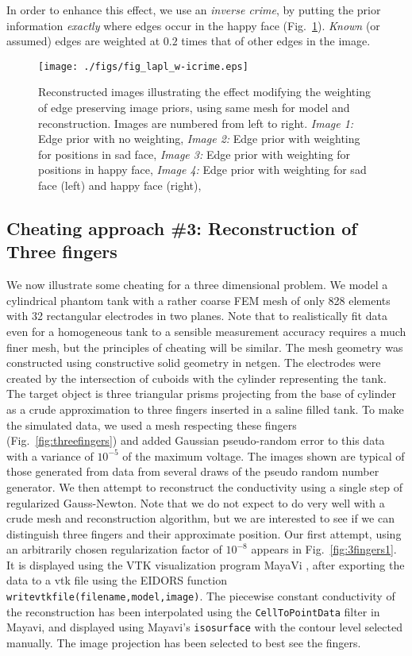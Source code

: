 \documentclass[12pt]{iopart}
\begin{document}
In order to enhance this effect, we use an {\em inverse crime},
by putting the prior information {\em exactly} where edges
occur in the happy face
(Fig.~\ref{fig:laplprior-icrime}).
{\em Known} (or assumed) edges are weighted at $0.2$ times that of other
edges in the image.

%
%
\begin{figure}[th]
\begin{flushright}
\texttt{[image: ./figs/fig\_lapl\_w-icrime.eps]}
\caption{\small 
Reconstructed images illustrating the effect modifying the
weighting of edge preserving image priors,
using same mesh for model and reconstruction.
Images are numbered from left to right.
{\em Image 1:} Edge prior with no weighting,
{\em Image 2:} Edge prior with weighting for positions in sad face,
{\em Image 3:} Edge prior with weighting for positions in happy face,
{\em Image 4:} Edge prior with weighting for sad face (left) and
happy face (right),
 }
 \label{fig:laplprior-icrime}
\end{flushright}
\end{figure}


\subsection{
Cheating approach \#3:
     Reconstruction of Three fingers
}
We now illustrate some cheating for a three dimensional
problem. We model a cylindrical phantom tank with a rather
coarse FEM mesh of only 828 elements with 32 rectangular
electrodes in two planes. Note that to realistically
fit data even for a homogeneous tank to a sensible
measurement accuracy requires a much finer mesh, but the
principles of cheating will be similar. The mesh geometry
was constructed using constructive solid geometry in
netgen. The electrodes were created by the intersection
of cuboids with the cylinder representing the tank. The
target object is three triangular prisms projecting from
the base of cylinder as a crude approximation to three
fingers inserted in a saline filled tank. To make the
simulated data, we used a mesh respecting these fingers
(Fig.~\ref{fig:threefingers}) and added Gaussian pseudo-random
error to this data with a variance of $10^{-5}$ of the maximum
voltage. The images shown are typical of those generated
from data from several draws of the pseudo random number
generator. We then attempt to reconstruct the conductivity
using a single step of regularized Gauss-Newton. Note that we do not expect to do
very well with a crude mesh and reconstruction algorithm,
but we are interested to see if we can distinguish three
fingers and their approximate position. Our first attempt,
using an arbitrarily chosen regularization factor
of $10^{-8}$ appears in Fig.~\ref{fig:3fingers1}. It is
displayed using the VTK visualization program MayaVi
\cite{Ramachandran_2003}, after exporting the data to a vtk file
using the EIDORS function {\tt writevtkfile(filename,model,image)}. The
piecewise constant conductivity of the reconstruction has
been interpolated using the {\tt CellToPointData} filter in
Mayavi, and displayed using Mayavi's {\tt isosurface} with
the contour level selected manually. The image projection
has been selected to best see the fingers.
\end{document}
